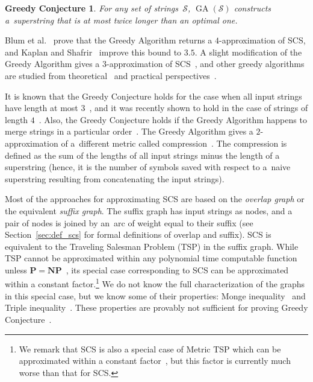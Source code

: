 \newtheorem*{gc}{Greedy Conjecture}
\begin{gc}
For any set of strings~$\mathcal{S}$, $\operatorname{GA}(\mathcal{S})$ constructs a~superstring that is at most twice longer than an optimal one.
\end{gc}


Blum et al.~\cite{BJLTY1991} prove that the Greedy Algorithm returns a $4$-approximation of SCS, and Kaplan and Shafrir~\cite{KS2005} improve this bound to $3.5$. A slight modification of the Greedy Algorithm gives a $3$-approximation of SCS~\cite{BJLTY1991}, and other greedy algorithms are studied from theoretical~\cite{BJLTY1991,rivals2018superstrings} and practical perspectives~\cite{romero2004experimental, cazaux2018practical}.

It is known that the Greedy Conjecture holds for the case when all input strings have length at most $3$~\cite{TU1988, cazaux20143}, and it was recently shown to hold in the case of strings of length $4$~\cite{kulikov2015greedy}. Also, the Greedy Conjecture holds if the Greedy Algorithm happens to merge strings in a particular order~\cite{weinard2006greedy, laube2005conditional}. The Greedy Algorithm gives a $2$-approximation of a~different metric called compression~\cite{TU1988}. The compression is defined as the sum of the lengths of all input strings minus the length of a superstring
(hence, it is the number of symbols saved with respect to a~naive superstring resulting from concatenating the input strings).



Most of the approaches for approximating SCS are based on the
{\em overlap graph} or the equivalent \emph{suffix graph}. The suffix graph has input strings as nodes, and a pair of nodes 
is joined by an~arc of weight equal to their suffix (see Section~\ref{sec:def_scs} for formal definitions of overlap and suffix).
SCS is equivalent to the Traveling Salesman Problem (TSP) in the suffix graph. While TSP cannot be approximated within any polynomial time computable function unless $\mathbf{P}=\mathbf{NP}$~\cite{SG1976}, its special case corresponding to SCS can be approximated within a constant factor.\footnote{We remark that SCS is also a special case of Metric TSP which can be approximated within a constant factor~\cite{svensson2018constant}, but this factor is currently much worse than that for SCS.} We do not know the full characterization of the graphs in this special case, but we know some of their properties: Monge inequality~\cite{monge} and Triple inequality~\cite{weinard2006greedy}. These properties are provably not sufficient for proving Greedy Conjecture~\cite{weinard2006greedy, laube2005conditional}. 

